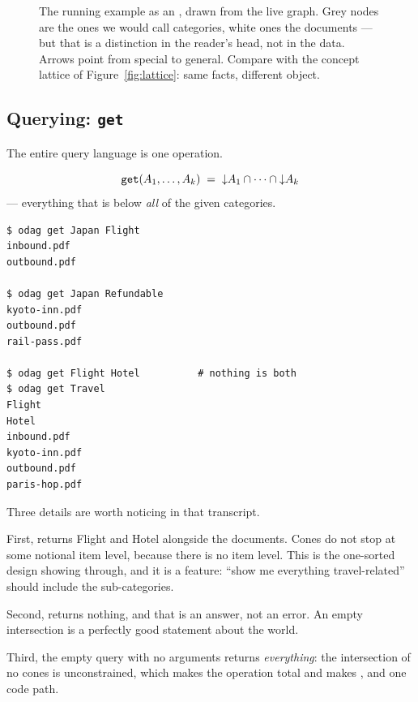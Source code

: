 \begin{figure}[t]
\centering
{}
\caption{The running example as an \odag{}, drawn from the live graph. Grey
nodes are the ones we would call categories, white ones the documents --- but
that is a distinction in the reader's head, not in the data. Arrows point from
special to general. Compare with the concept lattice of
Figure~\ref{fig:lattice}: same facts, different object.}
\label{fig:ontodag}
\end{figure}

\subsection{Querying: \texttt{get}}
\label{sec:get}

The entire query language is one operation.

\begin{definition}
\[
  \texttt{get}(A_1, \dots, A_k) \;=\; \mathord{\downarrow}A_1 \cap \cdots \cap \mathord{\downarrow}A_k
\]
--- everything that is below \emph{all} of the given categories.
\end{definition}

\begin{lstlisting}
$ odag get Japan Flight
inbound.pdf
outbound.pdf

$ odag get Japan Refundable
kyoto-inn.pdf
outbound.pdf
rail-pass.pdf

$ odag get Flight Hotel          # nothing is both
$ odag get Travel
Flight
Hotel
inbound.pdf
kyoto-inn.pdf
outbound.pdf
paris-hop.pdf
\end{lstlisting}

Three details are worth noticing in that transcript.

First,  returns \textsf{Flight} and \textsf{Hotel} alongside
the documents. Cones do not stop at some notional item level, because there is
no item level. This is the one-sorted design showing through, and it is a
feature: ``show me everything travel-related'' should include the
sub-categories.

Second,  returns nothing, and that is an answer, not an
error. An empty intersection is a perfectly good statement about the world.

Third, the empty query  with no arguments returns \emph{everything}:
the intersection of no cones is unconstrained, which makes the operation
total and makes ,  and  one code path.

